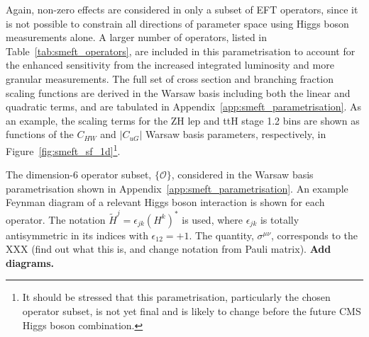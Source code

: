 Again, non-zero effects are considered in only a subset of EFT operators, since it is not possible to constrain all directions of parameter space using Higgs boson measurements alone. A larger number of operators, listed in Table~\ref{tab:smeft_operators}, are included in this parametrisation to account for the enhanced sensitivity from the increased integrated luminosity and more granular measurements. The full set of cross section and branching fraction scaling functions are derived in the Warsaw basis including both the linear and quadratic terms, and are tabulated in Appendix~\ref{app:smeft_parametrisation}. As an example, the scaling terms for the ZH lep and ttH stage 1.2 bins are shown as functions of the $C_{HW}$ and $|C_{uG}|$ Warsaw basis parameters, respectively, in Figure~\ref{fig:smeft_sf_1d}\footnote{It should be stressed that this parametrisation, particularly the chosen operator subset, is not yet final and is likely to change before the future CMS Higgs boson combination.}.

\begin{table}[htb!]
  \centering
  \scriptsize
  \renewcommand{\arraystretch}{1.5}
  \setlength{\tabcolsep}{3pt}
  \caption[Operator subset in the Warsaw basis parametrisation]
  {
    The dimension-6 operator subset, $\{\mathcal{O}\}$, considered in the Warsaw basis parametrisation shown in Appendix~\ref{app:smeft_parametrisation}. An example Feynman diagram of a relevant Higgs boson interaction is shown for each operator. The notation $\tilde{H}^j=\epsilon_{jk}(H^k)^*$ is used, where $\epsilon_{jk}$ is totally antisymmetric in its indices with $\epsilon_{12}=+1$. The quantity, $\sigma^{\mu\nu}$, corresponds to the XXX (find out what this is, and change notation from Pauli matrix). \textbf{Add diagrams.}
  }
  \label{tab:smeft_operators}
  
\end{table}

